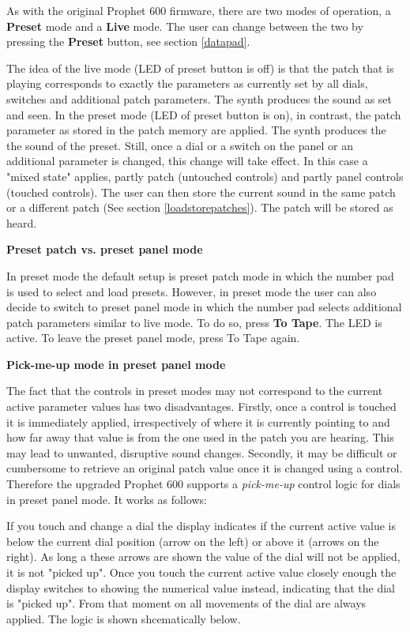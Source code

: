 As with the original Prophet 600 firmware, there are two modes of operation, a \textbf{Preset} mode and a \textbf{Live} mode. The user can change between the two by pressing the \textbf{Preset} button, see section \ref{datapad}. 

The idea of the live mode (LED of preset button is off) is that the patch that is playing corresponds to exactly the parameters as currently set by all dials, switches and additional patch parameters. The synth produces the sound as set and seen. In the preset mode (LED of preset button is on), in contrast, the patch parameter as stored in the patch memory are applied. The synth produces the the sound of the preset. Still, once a dial or a switch on the panel or an additional parameter is changed, this change will take effect. In this case a "mixed state" applies, partly patch (untouched controls) and partly panel controls (touched controls). The user can then store the current sound in the same patch or a different patch (See section \ref{loadstorepatches}). The patch will be stored as heard. 

\textbf{Preset patch vs. preset panel mode}

In preset mode the default setup is preset patch mode in which the number pad is used to select and load presets. However, in preset mode the user can also decide to switch to preset panel mode in which the number pad selects additional patch parameters similar to live mode. To do so, press \textbf{To Tape}. The LED is active. To leave the preset panel mode, press To Tape again. 

\textbf{Pick-me-up mode in preset panel mode}

The fact that the controls in preset modes may not correspond to the current active parameter values has two disadvantages. Firstly, once a control is touched it is immediately applied, irrespectively of where it is currently pointing to and how far away that value is from the one used in the patch you are hearing. This may lead to unwanted, disruptive sound changes. Secondly, it may be difficult or cumbersome to retrieve an original patch value once it is changed using a control. Therefore the upgraded Prophet 600 supports a \textit{pick-me-up} control logic for dials in preset panel mode. It works as follows:

If you touch and change a dial the display indicates if the current active value is below the current dial position (arrow on the left) or above it (arrows on the right). As long a these arrows are shown the value of the dial will not be applied, it is not "picked up". Once you touch the current active value closely enough the display switches to showing the numerical value instead, indicating that the dial is "picked up". From that moment on all movements of the dial are always applied. The logic is shown shcematically below.

